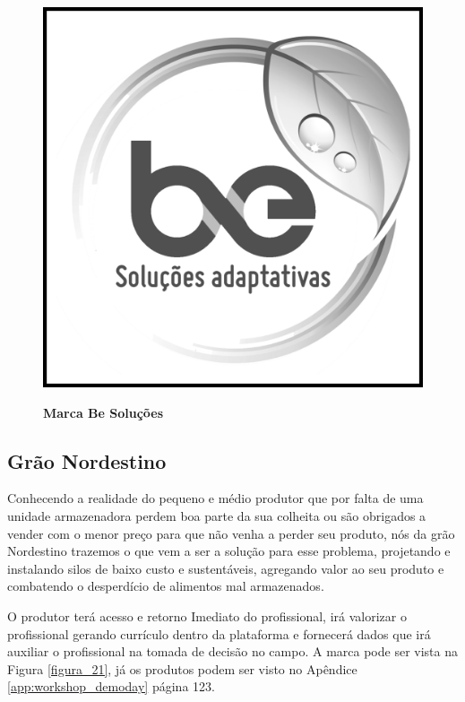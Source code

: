 \begin{figure}[H]
\centering
\caption{\textbf{Marca Be Soluções}}
\includegraphics[scale=0.11]{Imagens/besolucoes.png}
\label{figura_20}
\end{figure}




\subsection{Grão Nordestino}

Conhecendo a realidade do pequeno e médio produtor que por falta de uma unidade armazenadora perdem boa parte da sua colheita ou são obrigados a vender com o menor preço para que não venha a perder seu produto, nós da grão Nordestino trazemos o que vem a ser a solução para esse problema, projetando e instalando silos de baixo custo e sustentáveis, agregando valor ao seu produto e combatendo o desperdício de alimentos mal armazenados.

O produtor terá acesso e retorno Imediato do profissional, irá valorizar o profissional gerando currículo dentro da plataforma e fornecerá dados que irá auxiliar o profissional na tomada de decisão no campo. A marca pode ser vista na Figura \ref{figura_21}, já os produtos podem ser visto no Apêndice \ref{app:workshop_demoday} página 123.


